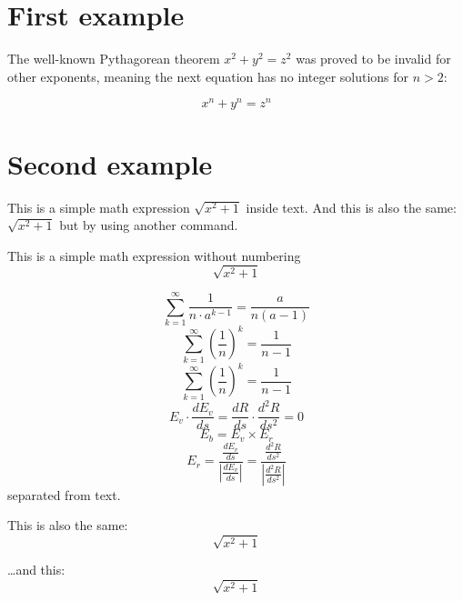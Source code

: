 \documentclass{article}
\begin{document}
\section{First example}

The well-known Pythagorean theorem \(x^2 + y^2 = z^2\) was proved to be invalid for other exponents, meaning the next equation has no integer solutions for \(n>2\):

\[ x^n + y^n = z^n \]

\section{Second example}

This is a simple math expression \(\sqrt{x^2+1}\) inside text.
And this is also the same:
\begin{math}
\sqrt{x^2+1}
\end{math}
but by using another command.

This is a simple math expression without numbering
\[\sqrt{x^2+1}\]

\[\sum_{k=1}^\infty \frac{1}{n \cdot a^{k-1}} = \frac{a} {n (a-1)}\]
\[\sum_{k=1}^\infty \left(\frac{1}{n} \right)^k = \frac {1} {n-1}\]
\[\sum_{k=1}^\infty (\frac{1}{n} )^k = \frac {1} {n-1}\]
\[E_v \cdot \frac {{d}E_v} {{d}s} = \frac {{d}R} {{d}s} \cdot \frac {{d}^2R} {{d}s^2} = 0\]
\[E_b = E_v \times E_r\]
\[E_r = \frac {\frac {{d}E_v} {{d}s}} {\left | \frac {{d}E_v} {{d}s} \right |} = \frac {\frac {{d}^2 R} {{d}s^2}} {\left | \frac {{d}^2 R} {{d}s^2} \right |} \]
separated from text.

This is also the same:
\begin{displaymath}
\sqrt{x^2+1}
\end{displaymath}

\ldots and this:
\begin{equation*}
\sqrt{x^2+1}
\end{equation*}
\end{document}

